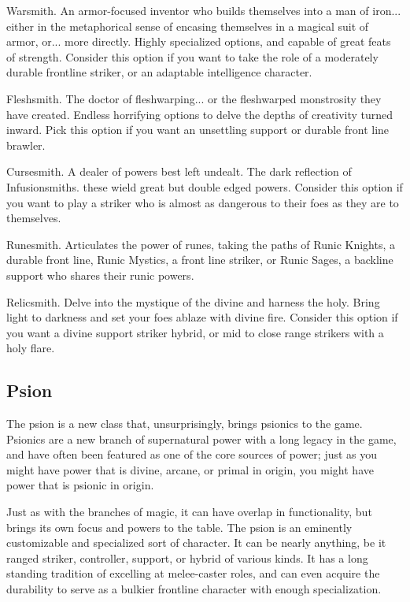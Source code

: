 \documentclass[11pt,twoside,openany]{book}  %
\begin{document}
\begin{fiveitemize}
	\item Warsmith. An armor-focused inventor who builds themselves into a man of iron... either in the metaphorical sense of encasing themselves in a magical suit of armor, or... more directly. Highly specialized options, and capable of great feats of strength. Consider this option if you want to take the role of a moderately durable frontline striker, or an adaptable intelligence character.
	\item Fleshsmith. The doctor of fleshwarping... or the fleshwarped monstrosity they have created. Endless horrifying options to delve the depths of creativity turned inward. Pick this option if you want an unsettling support or durable front line brawler.
	\item Cursesmith. A dealer of powers best left undealt. The dark reflection of Infusionsmiths. these wield great but double edged powers. Consider this option if you want to play a striker who is almost as dangerous to their foes as they are to themselves.
	\item Runesmith. Articulates the power of runes, taking the paths of Runic Knights, a durable front line, Runic Mystics, a front line striker, or Runic Sages, a backline support who shares their runic powers.
	\item Relicsmith. Delve into the mystique of the divine and harness the holy. Bring light to darkness and set your foes ablaze with divine fire. Consider this option if you want a divine support striker hybrid, or mid to close range strikers with a holy flare.
\end{fiveitemize}

\subsection*{Psion}
The psion is a new class that, unsurprisingly, brings psionics to the game. Psionics are a new branch of supernatural power with a long legacy in the game, and have often been featured as one of the core sources of power; just as you might have power that is divine, arcane, or primal in origin, you might have power that is psionic in origin.

Just as with the branches of magic, it can have overlap in functionality, but brings its own focus and powers to the table. The psion is an eminently customizable and specialized sort of character. It can be nearly anything, be it ranged striker, controller, support, or hybrid of various kinds. It has a long standing tradition of excelling at melee-caster roles, and can even acquire the durability to serve as a bulkier frontline character with enough specialization.
\end{document}
